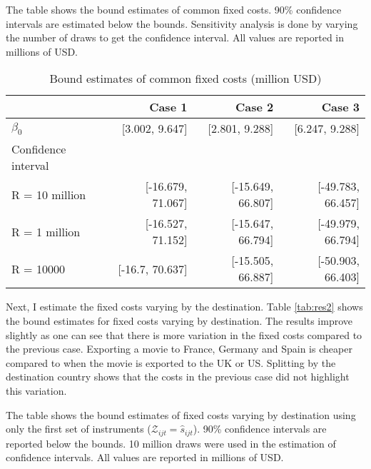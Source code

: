 \documentclass[11pt, letterpaper]{article} \usepackage{amsmath}
\newcommand{\floatintro}[1]{
  
  \vspace*{0.1in}
  
  {\footnotesize

    #1
    
  }
  
  \vspace*{0.1in} } \newcommand{\Hline}{\noindent\rule{18cm}{0.5pt}}
\begin{document}
\begin{table}[htbp!]
  \floatintro{The table shows the bound estimates of common fixed
    costs. 90\% confidence intervals are estimated below the
    bounds. Sensitivity analysis is done by varying the number of
    draws to get the confidence interval. All values are reported in
    millions of USD.}
  \centering
  \begin{tabular}{lrrr}
    \hline
    & Case 1 & Case 2 & Case 3 \\
    \hline
    $\beta_0$ & {[}3.002, 9.647{]} & {[}2.801, 9.288{]} & {[}6.247, 9.288{]} \\
    Confidence interval &  &  &  \\
    R = 10 million & {[}-16.679, 71.067{]} & {[}-15.649, 66.807{]} & {[}-49.783, 66.457{]} \\
    R = 1 million & {[}-16.527, 71.152{]} & {[}-15.647, 66.794{]} & {[}-49.979, 66.794{]} \\
    R = 10000 & {[}-16.7, 70.637{]} & {[}-15.505, 66.887{]} &
                                                              {[}-50.903, 66.403{]}\\
    \hline
  \end{tabular}
  \caption{Bound estimates of common fixed costs (million USD)}
  \label{tab:res1}
\end{table}
Next, I estimate the fixed costs varying by the destination. Table
\ref{tab:res2} shows the bound estimates for fixed costs varying by
destination. The results improve slightly as one can see that there is
more variation in the fixed costs compared to the previous
case. Exporting a movie to France, Germany and Spain is cheaper
compared to when the movie is exported to the UK or US. Splitting by
the destination country shows that the costs in the previous case did
not highlight this variation.
\begin{table}[htbp!]
  \floatintro{The table shows the bound estimates of fixed costs
    varying by destination using only the first set of instruments
    ($\mathcal{Z}_{ijt} = \hat s_{ijt}$). 90\% confidence intervals are reported
    below the bounds. 10 million draws were used in the estimation of
    confidence intervals. All values are
    reported in millions of USD.}
  \centering
  \caption{Bound estimates of fixed costs varying by destination
    (million USD)}
  \label{tab:res2}
\end{table}
\end{document}
